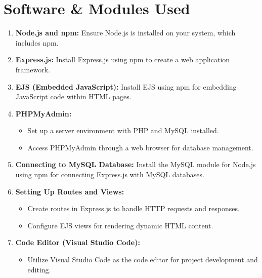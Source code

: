 \documentclass{report}
\begin{document}
\chapter{Software \& Modules Used}
\begin{enumerate}
\item \textbf{Node.js and npm:}
Ensure Node.js is installed on your system, which includes npm.

\item \textbf{Express.js:}
Install Express.js using npm to create a web application framework.

\item \textbf{EJS (Embedded JavaScript):}
Install EJS using npm for embedding JavaScript code within HTML pages.

\item \textbf{PHPMyAdmin:}
\begin{itemize}
\item Set up a server environment with PHP and MySQL installed.
\item Access PHPMyAdmin through a web browser for database management.
\end{itemize}

\item \textbf{Connecting to MySQL Database:}
Install the MySQL module for Node.js using npm for connecting Express.js
with MySQL databases.

\item \textbf{Setting Up Routes and Views:}
\begin{itemize}
\item Create routes in Express.js to handle HTTP requests and responses.
\item Configure EJS views for rendering dynamic HTML content.
\end{itemize}

\item \textbf{Code Editor (Visual Studio Code):}
\begin{itemize}
\item Utilize Visual Studio Code as the code editor for project development
and editing.
\end{itemize}
\end{enumerate}
\end{document}
